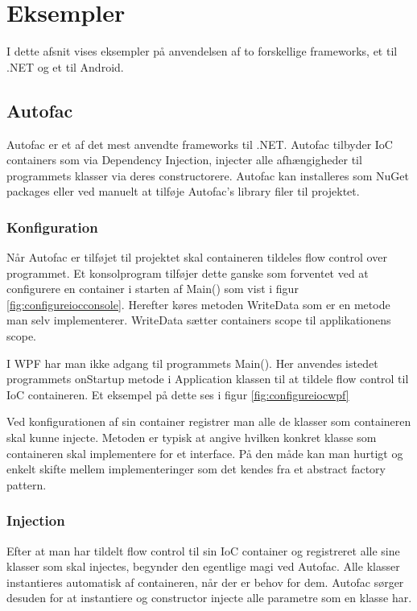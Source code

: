 \thispagestyle{fancy}
\chapter{Eksempler}
\label{chp:examples}
I dette afsnit vises eksempler på anvendelsen af to forskellige frameworks, et til .NET og et til Android. 
\section{Autofac}
Autofac er et af det mest anvendte frameworks til .NET. Autofac tilbyder IoC containers som via Dependency Injection, injecter alle afhængigheder til programmets klasser via deres constructorere. Autofac kan installeres som NuGet packages eller ved manuelt at tilføje Autofac's library filer til projektet.


\subsection{Konfiguration}
Når Autofac er tilføjet til projektet skal containeren tildeles flow control over programmet. Et konsolprogram tilføjer dette ganske som forventet ved at configurere en container i starten af Main() som vist i figur \ref{fig:configureiocconsole}. Herefter køres metoden WriteData som er en metode man selv implementerer. WriteData sætter containers scope til applikationens scope.

\FloatBarrier

I WPF har man ikke adgang til programmets Main(). Her anvendes istedet programmets onStartup metode i Application klassen til at tildele flow control til IoC containeren. Et eksempel på dette ses i figur \ref{fig:configureiocwpf}


Ved konfigurationen af sin container registrer man alle de klasser som containeren skal kunne injecte. Metoden er typisk at angive hvilken konkret klasse som containeren skal implementere for et interface. På den måde kan man hurtigt og enkelt skifte mellem implementeringer som det kendes fra et abstract factory pattern.

\subsection{Injection}
Efter at man har tildelt flow control til sin IoC container og registreret alle sine klasser som skal injectes, begynder den egentlige magi ved Autofac. Alle klasser instantieres automatisk af containeren, når der er behov for dem. Autofac sørger desuden for at instantiere og constructor injecte alle parametre som en klasse har.

